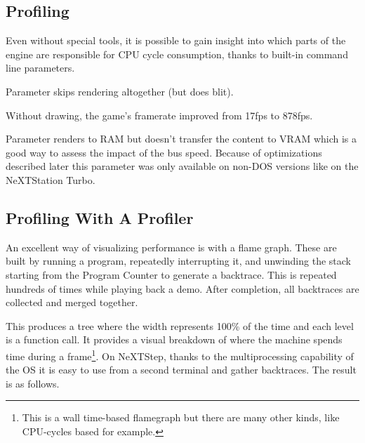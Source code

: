 \subsection{Profiling}
Even without special tools, it is possible to gain insight into which parts of the engine are responsible for CPU cycle consumption, thanks to built-in command line parameters.\\
\par
Parameter  skips rendering altogether (but does blit).\\
\par
\par
{}
\par
Without drawing, the game's framerate improved from 17fps to 878fps.\\
\par
Parameter  renders to RAM but doesn't transfer the content to VRAM which is a good way to assess the impact of the bus speed. Because of optimizations described later this parameter was only available on non-DOS versions like on the NeXTStation Turbo.\\
\par
{}


\vspace{-10mm}
\subsection{Profiling With A Profiler}
An excellent way of visualizing performance is with a flame graph. These are built by running a program, repeatedly interrupting it, and unwinding the stack starting from the Program Counter to generate a backtrace. This is repeated hundreds of times while playing back a demo. After completion, all backtraces are collected and merged together.\\
\par
 This produces a tree where the width represents 100\% of the time and each level is a function call. It provides a visual breakdown of where the machine spends time during a frame\footnote{This is a wall time-based flamegraph but there are many other kinds, like CPU-cycles based for example.}. On NeXTStep, thanks to the multiprocessing capability of the OS it is easy to use  from a second terminal and gather backtraces. The result is as follows.\\
\par


